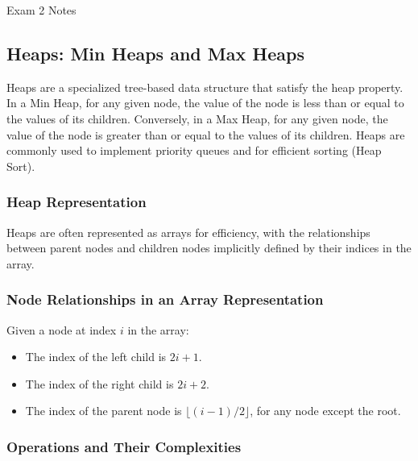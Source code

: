 \begin{examnotes}{Exam 2 Notes}
    \subsection*{Heaps: Min Heaps and Max Heaps}

    Heaps are a specialized tree-based data structure that satisfy the heap property. In a Min Heap, for any given node, the value of the node is less than or equal to the values of its children. 
    Conversely, in a Max Heap, for any given node, the value of the node is greater than or equal to the values of its children. Heaps are commonly used to implement priority queues and for efficient 
    sorting (Heap Sort).
    
    \subsubsection*{Heap Representation}
    
    Heaps are often represented as arrays for efficiency, with the relationships between parent nodes and children nodes implicitly defined by their indices in the array.
    
    \subsubsection*{Node Relationships in an Array Representation}
    
    Given a node at index $i$ in the array:
    \begin{itemize}
        \item The index of the left child is $2i + 1$.
        \item The index of the right child is $2i + 2$.
        \item The index of the parent node is $\lfloor (i-1) / 2 \rfloor$, for any node except the root.
    \end{itemize}
    
    \subsubsection*{Operations and Their Complexities}
    

\end{examnotes}

